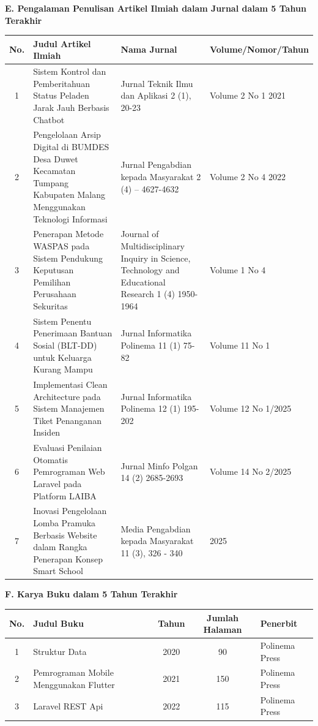 \textbf{E. Pengalaman Penulisan Artikel Ilmiah dalam Jurnal dalam 5 Tahun Terakhir}

{\footnotesize
\begin{longtable}{|c|p{6cm}|p{3.5cm}|p{4cm}|}
\hline
\textbf{No.} & \textbf{Judul Artikel Ilmiah} & \textbf{Nama Jurnal} & \textbf{Volume/Nomor/Tahun} \\
\hline
1 & Sistem Kontrol dan Pemberitahuan Status Peladen Jarak Jauh Berbasis Chatbot & Jurnal Teknik Ilmu dan Aplikasi 2 (1), 20-23 & Volume 2 No 1 2021 \\
\hline
2 & Pengelolaan Arsip Digital di BUMDES Desa Duwet Kecamatan Tumpang Kabupaten Malang Menggunakan Teknologi Informasi & Jurnal Pengabdian kepada Masyarakat 2 (4) – 4627-4632 & Volume 2 No 4 2022 \\
\hline
3 & Penerapan Metode WASPAS pada Sistem Pendukung Keputusan Pemilihan Perusahaan Sekuritas & Journal of Multidisciplinary Inquiry in Science, Technology and Educational Research 1 (4) 1950-1964 & Volume 1 No 4 \\
\hline
4 & Sistem Penentu Penerimaan Bantuan Sosial (BLT-DD) untuk Keluarga Kurang Mampu & Jurnal Informatika Polinema 11 (1) 75-82 & Volume 11 No 1 \\
\hline
5 & Implementasi Clean Architecture pada Sistem Manajemen Tiket Penanganan Insiden & Jurnal Informatika Polinema 12 (1) 195-202 & Volume 12 No 1/2025 \\
\hline
6 & Evaluasi Penilaian Otomatis Pemrograman Web Laravel pada Platform LAIBA & Jurnal Minfo Polgan 14 (2) 2685-2693 & Volume 14 No 2/2025 \\
\hline
7 & Inovasi Pengelolaan Lomba Pramuka Berbasis Website dalam Rangka Penerapan Konsep Smart School & Media Pengabdian kepada Masyarakat 11 (3), 326 - 340 & 2025 \\
\hline
\end{longtable}
}

\textbf{F. Karya Buku dalam 5 Tahun Terakhir}

{\footnotesize
\begin{longtable}{|c|p{5cm}|c|c|p{3cm}|}
\hline
\textbf{No.} & \textbf{Judul Buku} & \textbf{Tahun} & \textbf{Jumlah Halaman} & \textbf{Penerbit} \\
\hline
1 & Struktur Data & 2020 & 90 & Polinema Press \\
\hline
2 & Pemrograman Mobile Menggunakan Flutter & 2021 & 150 & Polinema Press \\
\hline
3 & Laravel REST Api & 2022 & 115 & Polinema Press \\
\hline
\end{longtable}
}

